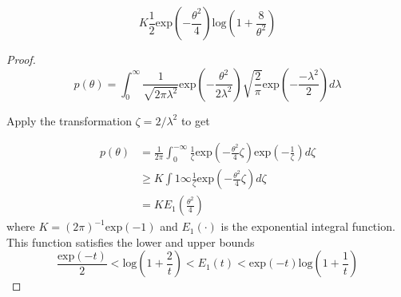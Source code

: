 \begin{theorem}
\[
  K \frac{1}{2}\text{exp} \left(-\frac{\theta^2}{4}\right)
    \text{log}\left(1 + \frac{8}{\theta^2}\right)
\]
\end{theorem}
\begin{proof}
\[
  p(\theta) = \int_0^{\infty} 
              \frac{1}{\sqrt{2 \pi \lambda^2}} 
              \text{exp}\left(-\frac{\theta^2}{2 \lambda ^2} \right)
              \sqrt{\frac{2}{\pi}}
              \text{exp}\left(-\frac{- \lambda^2}{2} \right) d\lambda
\]

Apply the transformation $\zeta = 2/ \lambda^2$ to get

\[
\begin{aligned}
  p(\theta) &= \frac{1}{2\pi} \int_0^{-\infty} \frac{1}{\zeta}
              \text{exp} \left(-\frac{\theta^2}{4}\zeta \right)
              \text{exp} \left(-\frac{1}{\zeta} \right) d\zeta \\
            &\geq K \int{1}{\infty} \frac{1}{\zeta}
              \text{exp} \left(-\frac{\theta^2}{4} \zeta\right) d\zeta \\
            &= K E_1 \left(\frac{\theta^2}{4} \right)
\end{aligned}  
\]
where $K = (2 \pi)^{-1} \text{exp}(-1)$ and $E_1(\cdot)$ is the exponential
integral function. This function satisfies the lower and upper bounds
\[
  \frac{\text{exp}(-t)}{2} < \text{log} \left(1 + \frac{2}{t}\right) <
  E_1(t) < \text{exp}(-t) \text{log} \left(1 + \frac{1}{t}\right)
\]
\end{proof}